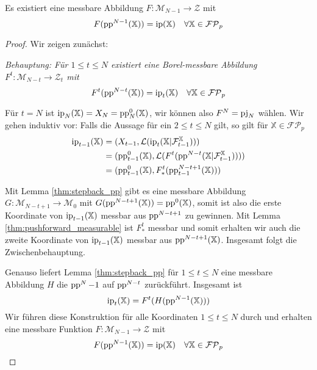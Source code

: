     \begin{lemma}\label{thm:ip_from_pp}
        Es existiert eine messbare Abbildung $F:\mathcal{M}_{N-1}\rightarrow \mathcal{Z}$ mit 
        $$F(\operatorname{pp}^{N-1}(\mathbb{X})) = \operatorname{ip}(\mathbb{X}) \quad \forall \mathbb{X} \in \mathcal{FP}_p$$
    \end{lemma}
    \begin{proof}
        Wir zeigen zunächst:

        \emph{Behauptung: Für $1\leq t \leq N$ existiert eine Borel-messbare Abbildung $F^t: \mathcal{M}_{N-t}\rightarrow \mathcal{Z}_t$ mit
        $$F^t(\operatorname{pp}^{N-t}(\mathbb{X})) = \operatorname{ip}_t(\mathbb{X}) \quad \forall \mathbb{X} \in \mathcal{FP}_p$$}

        Für $t=N$ ist $\operatorname{ip}_N(\mathbb{X}) = X_N = \operatorname{pp}_N^0(\mathbb{X})$, wir können also $F^N=\operatorname{pj}_N$ wählen. Wir gehen induktiv vor: Falls die Aussage für ein $2\leq t \leq N$ gilt, so gilt für $\mathbb{X} \in \mathcal{FP}_p$
        \begin{align*}
            \operatorname{ip}_{t-1}(\mathbb{X}) &= (X_{t-1}, \mathcal{L}(\operatorname{ip}_t(\mathbb{X} \vert \mathcal{F}_{t-1}^{\mathbb{X}}))) \\
            &= (\operatorname{pp}_{t-1}^0(\mathbb{X}), \mathcal{L}(F^t(\operatorname{pp}^{N-t}(\mathbb{X} \vert \mathcal{F}_{t-1}^\mathbb{X})))) \\
            &= (\operatorname{pp}_{t-1}^0(\mathbb{X}), F^t_*(\operatorname{pp}_{t-1}^{N-t+1}(\mathbb{X})))
        \end{align*}

        Mit Lemma \ref{thm:stepback_pp} gibt es eine messbare Abbildung $G: \mathcal{M}_{N-t+1}\rightarrow \mathcal{M}_0$ mit $G(\operatorname{pp}^{N-t+1}(\mathbb{X})) = \operatorname{pp}^{0}(\mathbb{X})$, somit ist also die erste Koordinate von $\operatorname{ip}_{t-1}(\mathbb{X})$ messbar aus $\operatorname{pp}^{N-t+1}$ zu gewinnen. Mit Lemma \ref{thm:pushforward_measurable} ist $F_*^t$ messbar und somit erhalten wir auch die zweite Koordinate von $\operatorname{ip}_{t-1}(\mathbb{X})$ messbar aus $\operatorname{pp}^{N-t+1}(\mathbb{X})$. Insgesamt folgt die Zwischenbehauptung. 

        Genauso liefert Lemma \ref{thm:stepback_pp} für $1\leq t \leq N$ eine messbare Abbildung $H$ die $\operatorname{pp}^N-1$ auf $\operatorname{pp}^{N-t}$ zurückführt. Insgesamt ist 
        $$\operatorname{ip}_t(\mathbb{X}) = F^t(H(\operatorname{pp}^{N-1}(\mathbb{X})))$$
        Wir führen diese Konstruktion für alle Koordinaten $1\leq t\leq N$ durch und erhalten eine messbare Funktion $F: \mathcal{M}_{N-1}\rightarrow \mathcal{Z}$ mit 
        $$F(\operatorname{pp}^{N-1}(\mathbb{X})) = \operatorname{ip}(\mathbb{X}) \quad \forall \mathbb{X} \in \mathcal{FP}_p$$
    \end{proof}

